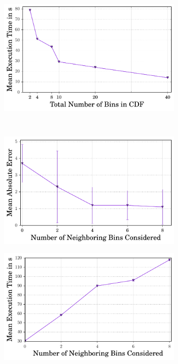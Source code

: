 \begin{figure}[ht]
\begin{subfigure}[b]{0.45\linewidth}
        \caption{}
        \label{fig:error:NumberOfBins}\end{subfigure}
        \begin{subfigure}[b]{0.45\linewidth}
        \includegraphics[width=1\linewidth]{index_numberOfBins_time.pdf}
        \caption{}
        \label{fig:time:NumberOfBins}
        \end{subfigure}
        \\  
        \begin{subfigure}[b]{0.45\linewidth}
    \centering \includegraphics[width=1\linewidth]{index_NeighboringBins_error.pdf}
        \caption{}
        \label{fig:error:NeighboringBins}\end{subfigure}
        \begin{subfigure}[b]{0.45\linewidth}
        \includegraphics[width=1\linewidth]{index_NeigboringBins_time.pdf}

\end{subfigure}
\end{figure}
